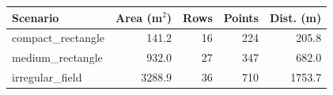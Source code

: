 \begin{tabular}{lrrrr}
\hline
Scenario & Area (m$^2$) & Rows & Points & Dist. (m) \\
\hline
compact\_rectangle & 141.2 & 16 & 224 & 205.8 \\
medium\_rectangle & 932.0 & 27 & 347 & 682.0 \\
irregular\_field & 3288.9 & 36 & 710 & 1753.7 \\
\hline
\end{tabular}
